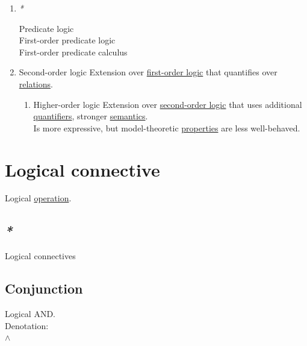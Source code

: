 \documentclass[a4paper,14pt,oneside]{book}
\begin{document}
\begin{enumerate}
\item \emph{*}
\label{sec:org818f4f4}

\label{org1cf8e71}Predicate logic\\
\label{org8838de1}First-order predicate logic\\
\label{orge8a12f1}First-order predicate calculus\\

\item \label{org155b7ce}Second-order logic
\label{sec:orgf036c42}
Extension over \hyperref[org9b93d56]{first-order logic} that quantifies over \hyperref[org2049f4a]{relations}.\\

\begin{enumerate}
\item \label{orgaf0c933}Higher-order logic
\label{sec:orgd8b6e66}
Extension over \hyperref[org155b7ce]{second-order logic} that uses additional \hyperref[org16b2a1a]{quantifiers}, stronger \hyperref[org7f4fabd]{semantics}.\\

Is more expressive, but model-theoretic \hyperref[orge0a1a8a]{properties} are less well-behaved.\\
\end{enumerate}
\end{enumerate}

\section{\label{orgf3b90af}Logical connective}
\label{sec:org22a00a3}
Logical \hyperref[orgbac7378]{operation}.\\

\subsection{\emph{*}}
\label{sec:org1593a40}

\label{org9756261}Logical connectives\\

\subsection{\label{org342cd84}Conjunction}
\label{sec:org3c5dee7}
Logical AND.\\

Denotation:\\
\(\land\)\\
\end{document}
